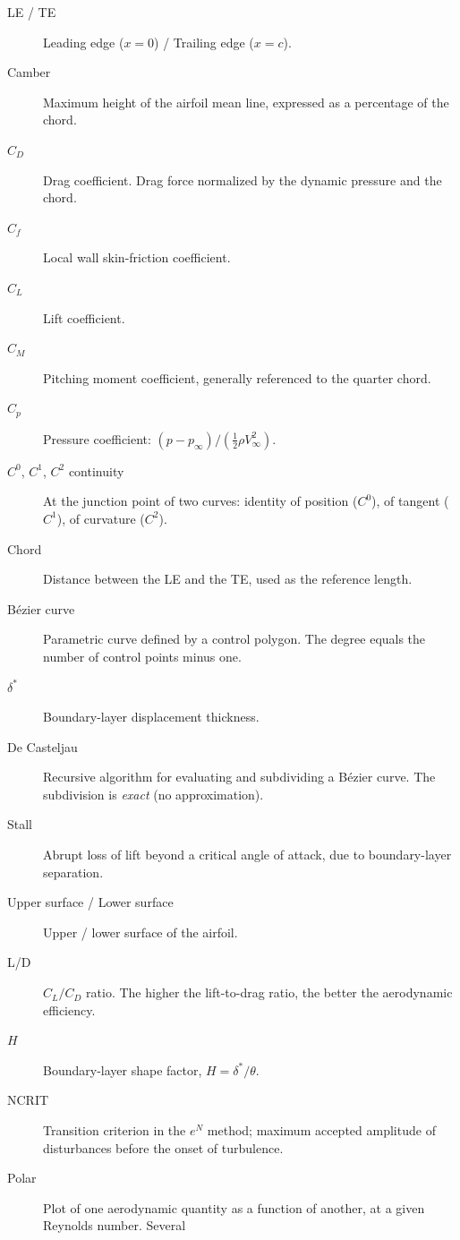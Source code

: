 \begin{description}
    \item[LE / TE] Leading edge ($x=0$) / Trailing edge ($x=c$).
    \item[Camber] Maximum height of the airfoil mean line,
        expressed as a percentage of the chord.
    \item[$C_D$] Drag coefficient. Drag force
        normalized by the dynamic pressure and the chord.
    \item[$C_f$] Local wall skin-friction coefficient.
    \item[$C_L$] Lift coefficient.
    \item[$C_M$] Pitching moment coefficient, generally
        referenced to the quarter chord.
    \item[$C_p$] Pressure coefficient: $(p - p_\infty) /
        (\frac{1}{2}\rho V_\infty^2)$.
    \item[$C^0$, $C^1$, $C^2$ continuity] At the junction point of two curves:
        identity of position ($C^0$), of tangent
        ($C^1$), of curvature ($C^2$).
    \item[Chord] Distance between the LE and the TE, used as the
        reference length.
    \item[Bézier curve] Parametric curve defined by a
        control polygon. The degree equals the number of
        control points minus one.
    \item[$\delta^*$] Boundary-layer displacement thickness.
    \item[De Casteljau] Recursive algorithm for evaluating and
        subdividing a Bézier curve. The subdivision is
        \emph{exact} (no approximation).
    \item[Stall] Abrupt loss of lift beyond a
        critical angle of attack, due to boundary-layer
        separation.
    \item[Upper surface / Lower surface] Upper / lower surface of the
        airfoil.
    \item[L/D] $C_L/C_D$ ratio. The higher the lift-to-drag ratio,
        the better the aerodynamic efficiency.
    \item[$H$] Boundary-layer shape factor,
        $H = \delta^*/\theta$.
    \item[NCRIT] Transition criterion in the $e^N$ method;
        maximum accepted amplitude of disturbances before
        the onset of turbulence.
    \item[Polar] Plot of one aerodynamic quantity as a
        function of another, at a given Reynolds number. Several

\end{description}
